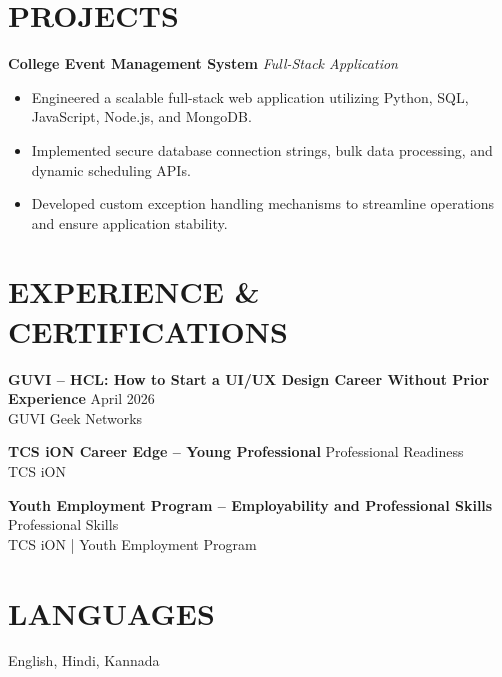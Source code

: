 \documentclass{article}
\begin{document}
\section*{PROJECTS}
\textbf{College Event Management System} \hfill \textit{Full-Stack Application}
\begin{itemize}[leftmargin=*]
    \item Engineered a scalable full-stack web application utilizing Python, SQL, JavaScript, Node.js, and MongoDB.
    \item Implemented secure database connection strings, bulk data processing, and dynamic scheduling APIs.
    \item Developed custom exception handling mechanisms to streamline operations and ensure application stability.
\end{itemize}

\section*{EXPERIENCE \& CERTIFICATIONS}
\textbf{GUVI – HCL: How to Start a UI/UX Design Career Without Prior Experience} \hfill April 2026 \\
GUVI Geek Networks
\vspace{4pt}

\noindent \textbf{TCS iON Career Edge – Young Professional} \hfill Professional Readiness \\
TCS iON
\vspace{4pt}

\noindent \textbf{Youth Employment Program – Employability and Professional Skills} \hfill Professional Skills \\
TCS iON | Youth Employment Program

\section*{LANGUAGES}
English, Hindi, Kannada
\end{document}
